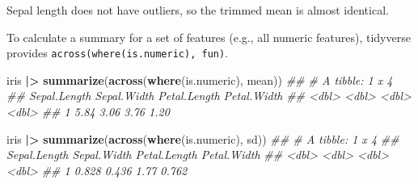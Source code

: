 \documentclass[
  notitlepage]{book}
\newenvironment{Shaded}{\begin{snugshade}}{\end{snugshade}}
\newcommand{\CommentTok}[1]{\textcolor[rgb]{0.56,0.35,0.01}{\textit{#1}}}
\newcommand{\ErrorTok}[1]{\textcolor[rgb]{0.64,0.00,0.00}{\textbf{#1}}}
\newcommand{\KeywordTok}[1]{\textcolor[rgb]{0.13,0.29,0.53}{\textbf{#1}}}
\newcommand{\NormalTok}[1]{#1}
\newcommand{\OperatorTok}[1]{\textcolor[rgb]{0.81,0.36,0.00}{\textbf{#1}}}
\newcommand{\StringTok}[1]{\textcolor[rgb]{0.31,0.60,0.02}{#1}}
\begin{document}
Sepal length does not have outliers, so the trimmed mean is almost
identical.

To calculate a summary for a set of features (e.g., all numeric
features), tidyverse provides \texttt{across(where(is.numeric),\ fun)}.

\begin{Shaded}
\begin{Highlighting}[]
\NormalTok{iris }\OperatorTok{|}\ErrorTok{\textgreater{}}\StringTok{ }\KeywordTok{summarize}\NormalTok{(}\KeywordTok{across}\NormalTok{(}\KeywordTok{where}\NormalTok{(is.numeric), mean))}
\CommentTok{\#\# \# A tibble: 1 x 4}
\CommentTok{\#\#   Sepal.Length Sepal.Width Petal.Length Petal.Width}
\CommentTok{\#\#          \textless{}dbl\textgreater{}       \textless{}dbl\textgreater{}        \textless{}dbl\textgreater{}       \textless{}dbl\textgreater{}}
\CommentTok{\#\# 1         5.84        3.06         3.76        1.20}
\end{Highlighting}
\end{Shaded}

\begin{Shaded}
\begin{Highlighting}[]
\NormalTok{iris }\OperatorTok{|}\ErrorTok{\textgreater{}}\StringTok{ }\KeywordTok{summarize}\NormalTok{(}\KeywordTok{across}\NormalTok{(}\KeywordTok{where}\NormalTok{(is.numeric), sd))}
\CommentTok{\#\# \# A tibble: 1 x 4}
\CommentTok{\#\#   Sepal.Length Sepal.Width Petal.Length Petal.Width}
\CommentTok{\#\#          \textless{}dbl\textgreater{}       \textless{}dbl\textgreater{}        \textless{}dbl\textgreater{}       \textless{}dbl\textgreater{}}
\CommentTok{\#\# 1        0.828       0.436         1.77       0.762}
\end{Highlighting}
\end{Shaded}
\end{document}
